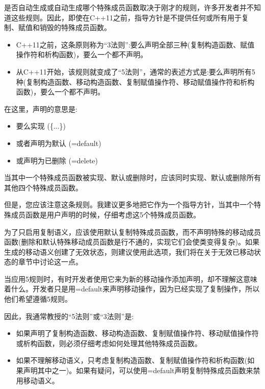 是否自动生成或自动生成哪个特殊成员函数取决于刚才的规则，许多开发者并不知道这些规则。因此，即使在C++11之前，指导方针是不提供任何或所有用于复制、赋值和销毁的特殊成员函数。

\begin{itemize}
	\item C++11之前，这条原则称为“3法则”:要么声明全部三种(复制构造函数、赋值操作符和析构函数)，要么一个都不声明。
	\item 从C++11开始，该规则就变成了“5法则”，通常的表述方式是:要么声明所有5种(复制构造函数、移动构造函数、复制赋值操作符、移动赋值操作符和析构函数)，要么一个都不声明。
\end{itemize}

在这里，声明的意思是:

\begin{itemize}
	\item 要么实现 (\{...\})
	\item 或者声明为默认 (=default)
	\item 或声明为已删除 (=delete)
\end{itemize}

当其中一个特殊成员函数被实现、默认或删除时，应该同时实现、默认或删除所有其他四个特殊成员函数。

但是，您应该注意这条规则。我建议更多地把它作为一个指导方针，当其中一个特殊成员函数是用户声明的时候，仔细考虑这5个特殊成员函数。

为了只启用复制语义，应该使用默认复制特殊成员函数，而不声明特殊的移动成员函数(删除和默认特殊移动成员函数是行不通的，实现它们会使类变得复杂)。如果生成的移动语义创建了无效状态，则建议使用此选项，我们将在关于无效已移动状态的章节中讨论这一点。

当应用5规则时，有时开发者使用它来为新的移动操作添加声明，却不理解这意味着什么。开发者只是用=default来声明移动操作，因为已经实现了复制操作，所以他们希望遵循5规则。

因此，我通常教授的“5法则”或“3法则”是:

\begin{itemize}
	\item 如果声明了复制构造函数、移动构造函数、复制赋值操作符、移动赋值操作符或析构函数，则必须仔细考虑如何处理其他特殊成员函数。
	\item 如果不理解移动语义，只考虑复制构造函数、复制赋值操作符和析构函数(如果声明其中之一)。如果有疑问，可以使用=default声明复制特殊成员函数来禁用移动语义。
\end{itemize}






















































